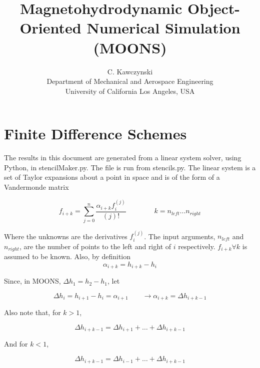 \documentclass[landscape]{article}
\begin{document}
\doublespacing
\title{Magnetohydrodynamic Object-Oriented Numerical Simulation (MOONS)}
\author{C. Kawczynski \\
Department of Mechanical and Aerospace Engineering \\
University of California Los Angeles, USA\\}
\maketitle

\section{Finite Difference Schemes}

The results in this document are generated from a linear system solver, using Python, in stencilMaker.py. The file is run from stencils.py. The linear system is a set of Taylor expansions about a point in space and is of the form of a Vandermonde matrix

\begin{equation}
	f_{i+k}
	=
	\sum_{j=0}^n
	\frac{\alpha_{i+k} f_{i}^{(j)}}{(j)!}
	\qquad \qquad
	k = n_{left} \dots n_{right}
\end{equation}

Where the unknowns are the derivatives $f_i^{(j)}$. The input arguments, $n_{left}$ and $n_{right}$, are the number of points to the left and right of $i$ respectively. $f_{i+k}\forall k$ is assumed to be known. Also, by definition
\begin{equation}
	\alpha_{i+k} 
	=
	h_{i+k} - h_{i}
\end{equation}

Since, in MOONS, $\Delta h_1 = h_2 - h_1$, let

\begin{equation}
	\Delta h_{i}
	=
	h_{i+1} - h_{i}
	=
	\alpha_{i+1}
	\qquad
	\rightarrow
	\alpha_{i+k} = \Delta h_{i+k-1}
\end{equation}

Also note that, for $k>1$,

\begin{equation}
	\Delta h_{i+k-1}
	=
	\Delta h_{i+1}
	+
	\dots
	+
	\Delta h_{i+k-1}
\end{equation}

And for $k<1$,

\begin{equation}
	\Delta h_{i+k-1}
	=
	\Delta h_{i-1}
	+
	\dots
	+
	\Delta h_{i+k-1}
\end{equation}
\end{document}
